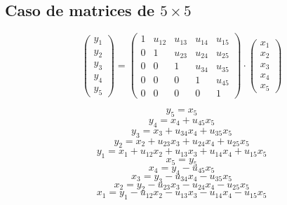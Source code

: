 \documentclass[10pt,a4paper,dvipdfmx]{article}
\begin{document}
\subsection{Caso de matrices de $5\times 5$ }
$$ \left( 
\begin{array}{c}
y_{1} \\
y_{2} \\
y_{3} \\
y_{4} \\
y_{5} 
 \end{array}
\right)
 = \left( 
\begin{array}{ccccc}
1 & u_{{1}{2}} & u_{{1}{3}} & u_{{1}{4}} & u_{{1}{5}} \\
0 & 1 & u_{{2}{3}} & u_{{2}{4}} & u_{{2}{5}} \\
0 & 0 & 1 & u_{{3}{4}} & u_{{3}{5}} \\
0 & 0 & 0 & 1 & u_{{4}{5}} \\
0 & 0 & 0 & 0 & 1 
 \end{array}
\right)
 \cdot \left( 
\begin{array}{c}
x_{1} \\
x_{2} \\
x_{3} \\
x_{4} \\
x_{5} 
 \end{array}
\right)
 $$
\begin{multicols}{2}
$$ y_{5} = x_{5} $$
$$ y_{4} = x_{4} + u_{{4}{5}} x_{5} $$
$$ y_{3} = x_{3} + u_{{3}{4}} x_{4} + u_{{3}{5}} x_{5} $$
$$ y_{2} = x_{2} + u_{{2}{3}} x_{3} + u_{{2}{4}} x_{4} + u_{{2}{5}} x_{5} $$
$$ y_{1} = x_{1} + u_{{1}{2}} x_{2} + u_{{1}{3}} x_{3} + u_{{1}{4}} x_{4} + u_{{1}{5}} x_{5} $$
\vfill\null
\columnbreak
$$ x_{5} = y_{5} $$
$$ x_{4} = y_{4}- u_{{4}{5}} x_{5} $$
$$ x_{3} = y_{3}- u_{{3}{4}} x_{4}- u_{{3}{5}} x_{5} $$
$$ x_{2} = y_{2}- u_{{2}{3}} x_{3}- u_{{2}{4}} x_{4}- u_{{2}{5}} x_{5} $$
$$ x_{1} = y_{1}- u_{{1}{2}} x_{2}- u_{{1}{3}} x_{3}- u_{{1}{4}} x_{4}- u_{{1}{5}} x_{5} $$
\end{multicols}
\end{document}
